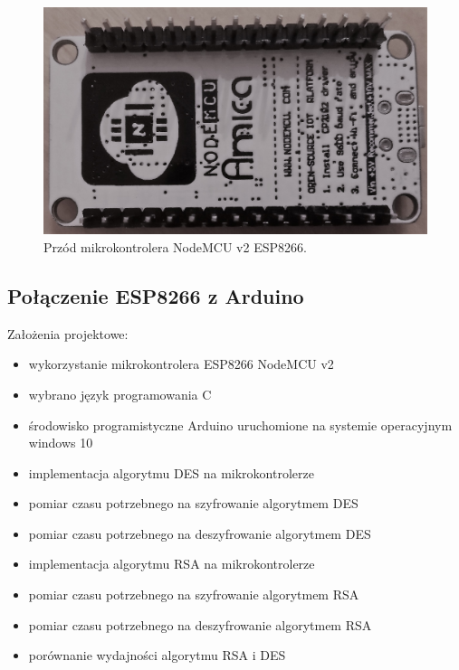 \documentclass[12p]{article}
\begin{document}
\begin{figure}[H]
\centering
\includegraphics[width=12cm]{esp8266_1.jpg}
\caption{Przód mikrokontrolera NodeMCU v2 ESP8266.}\label{esp_1}
\end{figure}

\subsection{Połączenie ESP8266 z Arduino}
Założenia projektowe:
\begin{itemize}
\item wykorzystanie mikrokontrolera ESP8266 NodeMCU v2
\item wybrano język programowania C
\item środowisko programistyczne Arduino uruchomione na systemie operacyjnym windows 10
\item implementacja algorytmu DES na mikrokontrolerze
\item pomiar czasu potrzebnego na szyfrowanie algorytmem DES
\item pomiar czasu potrzebnego na deszyfrowanie algorytmem DES
\item implementacja algorytmu RSA na mikrokontrolerze
\item pomiar czasu potrzebnego na szyfrowanie algorytmem RSA
\item pomiar czasu potrzebnego na deszyfrowanie algorytmem RSA
\item porównanie wydajności algorytmu RSA i DES
\end{itemize}
\end{document}
